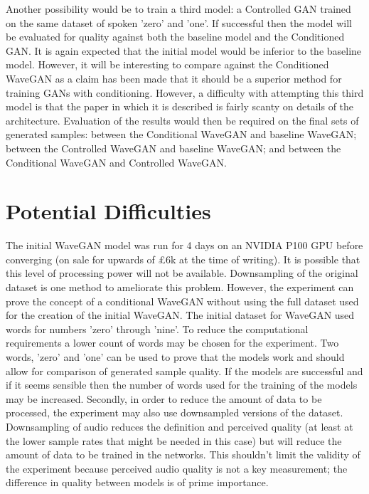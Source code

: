 \documentclass[titlepage]{article}
\begin{document}
  Another possibility would be to train a third model: a Controlled GAN trained on the same dataset of spoken 'zero' and 'one'.
If successful then the model will be evaluated for quality against both the baseline model and the Conditioned GAN.
It is again expected that the initial model would be inferior to the baseline model.
However, it will be interesting to compare against the Conditioned WaveGAN as a claim has been made that it should be a superior method for training GANs with conditioning.
However, a difficulty with attempting this third model is that the paper in which it is described is fairly scanty on details of the architecture.
\newline
\newline
Evaluation of the results would then be required on the final sets of generated samples: between the Conditional WaveGAN and baseline WaveGAN; between the Controlled WaveGAN and baseline WaveGAN; and between the Conditional WaveGAN and Controlled WaveGAN.

\section{Potential Difficulties}

The initial WaveGAN model was run for 4 days on an NVIDIA P100 GPU before converging (on sale for upwards of £6k at the time of writing).
It is possible that this level of processing power will not be available.
Downsampling of the original dataset is one method to ameliorate this problem.
\newline
\newline
However, the experiment can prove the concept of a conditional WaveGAN without using the full dataset used for the creation of the initial WaveGAN.
The initial dataset for WaveGAN used words for numbers 'zero' through 'nine'.
To reduce the computational requirements a lower count of words may be chosen for the experiment.
Two words, 'zero' and 'one' can be used to prove that the models work and should allow for comparison of generated sample quality.
If the models are successful and if it seems sensible then the number of words used for the training of the models may be increased.
\newline
\newline
Secondly, in order to reduce the amount of data to be processed, the experiment may also use downsampled versions of the dataset.
Downsampling of audio reduces the definition and perceived quality (at least at the lower sample rates that might be needed in this case) but will reduce the amount of data to be trained in the networks.
This shouldn't limit the validity of the experiment because perceived audio quality is not a key measurement; the difference in quality between models is of prime importance.
\end{document}
